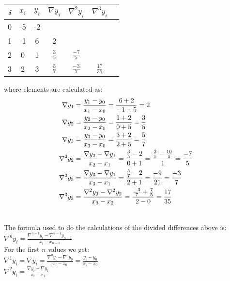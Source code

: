 \documentclass[12pt]{article}
\begin{document}
\begin{table}[H]
\centering
\begin{tabular}{|c|c|c|c|c|c|c|}
\hline
\textit{i} & $x_i$ & $y_i$ & $\nabla y_i$ & $\nabla ^2 y_i$ & $\nabla ^3 y_i$ \\ \hline
0 & -5 & -2  &  &  & \\ \hline
1 & -1 & 6 & 2 &  &   \\ \hline
2 & 0 & 1 & $\frac{3}{5}$ & $\frac{-7}{5}$ &  \\ \hline
3 & 2 & 3 & $\frac{5}{7}$ & $\frac{-3}{7}$ & $\frac{17}{35}$  \\ \hline
\end{tabular}
\end{table}

where elements are calculated as:\\
\begin{align}
\notag
\nabla y_1 &= \frac{y_1-y_0}{x_1-x_0}=\frac{6+2}{-1+5}=2 \\
\notag
\nabla y_2 &= \frac{y_2-y_0}{x_2-x_0}=\frac{1+2}{0+5}=\frac{3}{5} \\
\notag
\nabla y_3 &= \frac{y_3-y_0}{x_3-x_0}=\frac{3+2}{2+5}=\frac{5}{7} \\
\notag
\nabla ^2 y_2 &= \frac{\nabla y_2-\nabla y_1}{x_2-x_1}=\frac{\frac{3}{5} - 2}{0+1}=\frac{\frac{3}{5} - \frac{10}{5}}{1}=\frac{-7}{5} \\
\notag
\nabla ^2 y_3 &= \frac{\nabla y_3-\nabla y_1}{x_3-x_1}=\frac{\frac{5}{7} - 2}{2+1}=\frac{-9}{21}=\frac{-3}{7} \\
\notag
\nabla ^3 y_3 &= \frac{\nabla ^2 y_3-\nabla ^2 y_2}{x_3-x_2}=\frac{\frac{-3}{7} + \frac{7}{5}}{2-0}=\frac{17}{35} \\
\notag
\end{align}

The formula used to do the calculations of the divided differences above is: \\

$ \nabla ^n y_i = \frac{\nabla ^{n-1} y_i - \nabla ^{n-1} y_{n-1}}{x_i-x_{n-1}} $ \\

For the first $n$ values we get: \\

$ \nabla ^1 y_i = \nabla y_i = \frac{\nabla ^0 y_i - \nabla ^0 y_{0}}{x_i-x_{0}} = \frac{y_i-y_0}{x_i-x_0} $ \\

$ \nabla ^2 y_i = \frac{\nabla y_i - \nabla y_1}{x_i-x_1} $ \\
\end{document}
